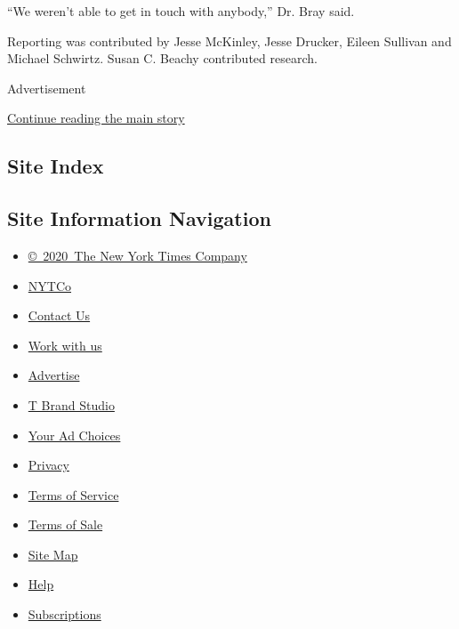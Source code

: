 ``We weren't able to get in touch with anybody,'' Dr. Bray said.

Reporting was contributed by Jesse McKinley, Jesse Drucker, Eileen
Sullivan and Michael Schwirtz. Susan C. Beachy contributed research.

Advertisement

\protect\hyperlink{after-bottom}{Continue reading the main story}

\hypertarget{site-index}{%
\subsection{Site Index}\label{site-index}}

\hypertarget{site-information-navigation}{%
\subsection{Site Information
Navigation}\label{site-information-navigation}}

\begin{itemize}
\tightlist
\item
  \href{https://help.nytimes3xbfgragh.onion/hc/en-us/articles/115014792127-Copyright-notice}{©~2020~The
  New York Times Company}
\end{itemize}

\begin{itemize}
\tightlist
\item
  \href{https://www.nytco.com/}{NYTCo}
\item
  \href{https://help.nytimes3xbfgragh.onion/hc/en-us/articles/115015385887-Contact-Us}{Contact
  Us}
\item
  \href{https://www.nytco.com/careers/}{Work with us}
\item
  \href{https://nytmediakit.com/}{Advertise}
\item
  \href{http://www.tbrandstudio.com/}{T Brand Studio}
\item
  \href{https://www.nytimes3xbfgragh.onion/privacy/cookie-policy\#how-do-i-manage-trackers}{Your
  Ad Choices}
\item
  \href{https://www.nytimes3xbfgragh.onion/privacy}{Privacy}
\item
  \href{https://help.nytimes3xbfgragh.onion/hc/en-us/articles/115014893428-Terms-of-service}{Terms
  of Service}
\item
  \href{https://help.nytimes3xbfgragh.onion/hc/en-us/articles/115014893968-Terms-of-sale}{Terms
  of Sale}
\item
  \href{https://spiderbites.nytimes3xbfgragh.onion}{Site Map}
\item
  \href{https://help.nytimes3xbfgragh.onion/hc/en-us}{Help}
\item
  \href{https://www.nytimes3xbfgragh.onion/subscription?campaignId=37WXW}{Subscriptions}
\end{itemize}
